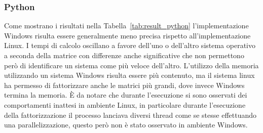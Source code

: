 \documentclass[a4paper, 12pt]{article}
\begin{document}
\subsubsection{Python}
Come mostrano i risultati nella Tabella~\ref{tab:result_python} l'implementazione
Windows risulta essere generalmente meno precisa rispetto all'implementazione
Linux.
I tempi di calcolo oscillano a favore dell'uno o dell'altro sistema operativo a
seconda della matrice con differenze anche significative che non permettono però
di identificare un sistema come più veloce dell'altro.
L'utilizzo della memoria utilizzando un sistema Windows risulta essere più
contenuto, ma il sistema linux ha permesso di fattorizzare anche le matrici più
grandi, dove invece Windows termina la memoria.
\`E da notare che durante l'esecuzione si sono osservati dei comportamenti
inattesi in ambiente Linux, in particolare durante l'esecuzione della
fattorizzazione il processo lanciava diversi thread come se stesse effettuando
una parallelizzazione, questo però non è stato osservato in ambiente Windows.
\end{document}
